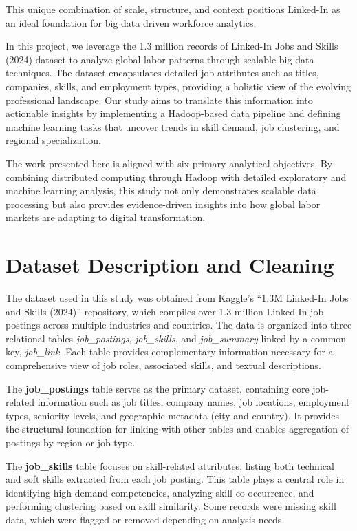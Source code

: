 \documentclass[conference]{IEEEtran}
\begin{document}
This unique combination of scale, structure, and context positions Linked-In as an ideal foundation for big data driven workforce analytics.

In this project, we leverage the 1.3 million records of Linked-In Jobs and Skills (2024) dataset to analyze global labor patterns through scalable big data techniques. The dataset encapsulates detailed job attributes such as titles, companies, skills, and employment types, providing a holistic view of the evolving professional landscape. Our study aims to translate this information into actionable insights by implementing a Hadoop-based data pipeline and defining machine learning tasks that uncover trends in skill demand, job clustering, and regional specialization.

The work presented here is aligned with six primary analytical objectives. By combining distributed computing through Hadoop with detailed exploratory and machine learning analysis, this study not only demonstrates scalable data processing but also provides evidence-driven insights into how global labor markets are adapting to digital transformation.


\section{Dataset Description and Cleaning}
The dataset used in this study was obtained from Kaggle's “1.3M Linked-In Jobs and Skills (2024)” repository, which compiles over 1.3 million Linked-In job postings across multiple industries and countries. The data is organized into three relational tables \textit{job\_postings}, \textit{job\_skills}, and \textit{job\_summary} linked by a common key, \textit{job\_link}. Each table provides complementary information necessary for a comprehensive view of job roles, associated skills, and textual descriptions.

The \textbf{job\_postings} table serves as the primary dataset, containing core job-related information such as job titles, company names, job locations, employment types, seniority levels, and geographic metadata (city and country). It provides the structural foundation for linking with other tables and enables aggregation of postings by region or job type.

The \textbf{job\_skills} table focuses on skill-related attributes, listing both technical and soft skills extracted from each job posting. This table plays a central role in identifying high-demand competencies, analyzing skill co-occurrence, and performing clustering based on skill similarity. Some records were missing skill data, which were flagged or removed depending on analysis needs.
\end{document}
